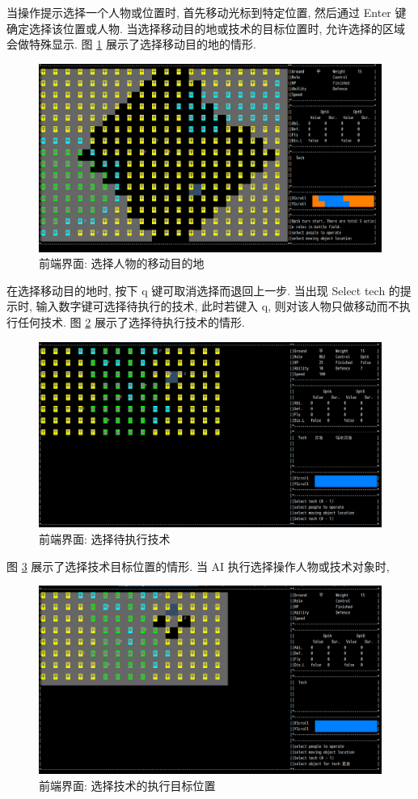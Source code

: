 \documentclass[UTF8, zihao=-4]{ctexart} %
\begin{document}
当操作提示选择一个人物或位置时, 首先移动光标到特定位置, 然后通过 Enter 键确定选择该位置或人物.
当选择移动目的地或技术的目标位置时, 允许选择的区域会做特殊显示. 图 \ref{fui_2} 展示了选择移动目的地的情形.
\begin{figure}
      \centering
      \includegraphics[width=\textwidth]{ui_sel_move.png}
      \caption{\label{fui_2}前端界面: 选择人物的移动目的地}
\end{figure}
在选择移动目的地时, 按下 q 键可取消选择而退回上一步. 当出现 Select tech 的提示时, 输入数字键可选择待执行的技术,
此时若键入 q, 则对该人物只做移动而不执行任何技术. 图 \ref{fui_3} 展示了选择待执行技术的情形.
\begin{figure}
      \centering
      \includegraphics[width=\textwidth]{ui_sel_tech.png}
      \caption{\label{fui_3}前端界面: 选择待执行技术}
\end{figure}
图 \ref{fui_4} 展示了选择技术目标位置的情形. 当 AI 执行选择操作人物或技术对象时, 
\begin{figure}
      \centering
      \includegraphics[width=\textwidth]{ui_sel_tech_obj.png}
      \caption{\label{fui_4}前端界面: 选择技术的执行目标位置}
\end{figure}
\end{document}
